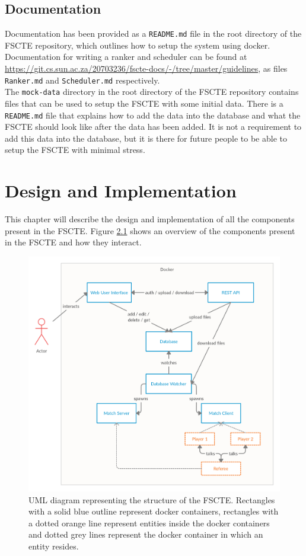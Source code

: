 \documentclass[a4paper, 11pt]{report}
\begin{document}
\section{Documentation}

Documentation has been provided as a \texttt{README.md} file in the root directory
of the FSCTE repository, which outlines how to setup the system using docker.
Documentation for writing a ranker and scheduler can be found at
\url{https://git.cs.sun.ac.za/20703236/fscte-docs/-/tree/master/guidelines},
as files \texttt{Ranker.md} and \texttt{Scheduler.md} respectively. \\

The \texttt{mock-data} directory in the root directory of the FSCTE repository
contains files that can be used to setup the FSCTE with some initial data. There
is a \texttt{README.md} file that explains how to add the data into the database
and what the FSCTE should look like after the data has been added. It is not a
requirement to add this data into the database, but it is there for future people
to be able to setup the FSCTE with minimal stress.

\chapter{Design and Implementation}
\label{chap:design}

This chapter will describe the design and implementation of all the components
present in the FSCTE. Figure \ref{fig:uml-structure} shows an overview of the
components present in the FSCTE and how they interact.
\begin{figure}[H]
	\centering
	\includegraphics[scale=0.238]{uml-structure.png}
	\caption{UML diagram representing the structure of the FSCTE. Rectangles
	with a solid blue outline represent docker containers, rectangles with a
	dotted orange line represent entities inside the docker containers and dotted
	grey lines represent the docker container in which an entity resides.}
	\label{fig:uml-structure}
\end{figure}
\end{document}
